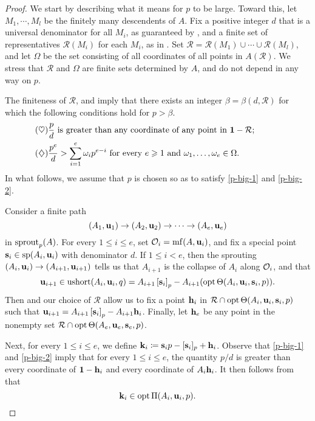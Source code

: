 \documentclass[11pt]{amsart}
\newcommand{\ushort}{\operatorname{ushort}}
\newcommand{\denom}{d}
\newcommand{\fsr}{\mathcal{R}}
\begin{document}
\begin{proof}
   We start by describing what it means for $p$ to be large.
   Toward this, let $M_1, \cdots, M_l$ be the finitely many descendents of  $A$.
   Fix a positive integer $\denom$ that is a universal denominator for all $M_i$, as guaranteed by , and a finite set of representatives $\fsr(M_i)$ for each $M_i$, as in .
   Set $\fsr = \fsr(M_1) \cup \cdots \cup \fsr(M_l)$, and let $\Omega$ be the set consisting of all coordinates of all points in $A(\fsr)$.
   We stress that $\fsr$ and $\Omega$ are finite sets determined by $A$, and do not depend in any way on $p$.

   The finiteness of $\fsr$,  and  
   imply that there exists an integer $\beta = \beta(\denom, \fsr)$ for which the following conditions hold for $p > \beta$. 
    \begin{align}
      \tag{$\heartsuit$} \label{p-big-1}
      &\text{$\frac{p}{\denom}$ is greater than any coordinate of any point in $\vv{1} - \fsr$;}\qquad\qquad\quad \\
      \tag{$\diamondsuit$} \label{p-big-2}
      &\text{$\frac{p^e}{\denom} > \sum_{i=1}^e \omega_i p^{e-i}$ for every $e \geq 1$ and $\omega_1, \ldots, \omega_e \in \Omega$.}
    \end{align}
    In what follows, we assume that $p$ is chosen so as to satisfy \eqref{p-big-1} and \eqref{p-big-2}. 

    Consider a finite path
    \[ (A_1, \mathbf{u}_1) \to (A_2, \mathbf{u}_2) \to \cdots \to (A_e, \mathbf{u}_e) \]
    in $\operatorname{sprout}_p(A)$.
    For every $1 \leq i \leq e$, set $\mathcal{O}_i = \operatorname{mf}(A, \mathbf{u}_i)$, and fix a special point $\mathbf{s}_i \in \operatorname{sp}(A_i, \mathbf{u}_i)$ with denominator $\denom$.
    If $1 \leq i < e$, then the sprouting $(A_i, \mathbf{u}_i) \to (A_{i+1}, \mathbf{u}_{i+1})$ tells us that $A_{i+1}$ is the collapse of $A_i$ along $\mathcal{O}_i$, and that
    \[
       \vv{u}_{i+1} \in \ushort(A_i, \vv{u}_i, q)= A_{i+1} \tail{\vv{s}_i}_p - A_{i+1}(\opt \ip( A_i, \vv{u}_i, \vv{s}_i, p)).
    \]
    Then  and our choice of $\fsr$ allow us to fix a point $\mathbf{h}_i$ in $\fsr \cap \opt \ip ( A_i, \vv{u}_i, \vv{s}_i, p)$ such that $\mathbf{u}_{i+1} = A_{i+1} \left[ \mathbf{s}_i \right]_p - A_{i+1} \mathbf{h}_i$.
    Finally, let $\mathbf{h}_e$ be any point in the nonempty set $\fsr \cap \opt \ip ( A_e, \vv{u}_e, \vv{s}_e, p)$.

    Next, for every $1 \leq i \leq e$,  we define $\mathbf{k}_i \coloneqq \mathbf{s}_i p - [\mathbf{s}_i]_p + \mathbf{h}_i$.
    Observe that \eqref{p-big-1} and \eqref{p-big-2} imply that for every $1 \leq i \leq e$, the quantity $p/\denom$ is greater than every coordinate of $\mathbf{1}-\mathbf{h}_i$ and every coordinate of $A_i \mathbf{h}_i$.
    It then follows from  that
    \begin{equation}
       \label{optimality-for-each-component: e}
       \mathbf{k}_i \in \operatorname{opt} \Pi(A_i, \mathbf{u}_i,p).
    \end{equation}


\end{proof}
\end{document}
